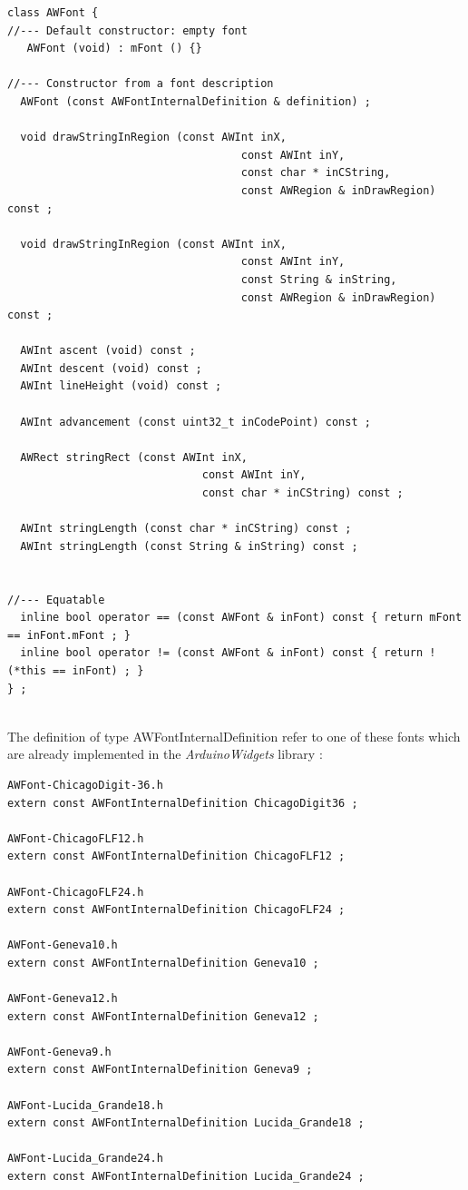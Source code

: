 \documentclass[a4paper,11pt]{extarticle}
\begin{document}
\begin{lstlisting}[language=Arduinonl]
class AWFont {
//--- Default constructor: empty font
   AWFont (void) : mFont () {}

//--- Constructor from a font description
  AWFont (const AWFontInternalDefinition & definition) ;

  void drawStringInRegion (const AWInt inX,
                                    const AWInt inY,
                                    const char * inCString,
                                    const AWRegion & inDrawRegion) const ;

  void drawStringInRegion (const AWInt inX,
                                    const AWInt inY,
                                    const String & inString,
                                    const AWRegion & inDrawRegion) const ;

  AWInt ascent (void) const ;
  AWInt descent (void) const ;
  AWInt lineHeight (void) const ;

  AWInt advancement (const uint32_t inCodePoint) const ;

  AWRect stringRect (const AWInt inX,
                              const AWInt inY,
                              const char * inCString) const ;

  AWInt stringLength (const char * inCString) const ;
  AWInt stringLength (const String & inString) const ;


//--- Equatable
  inline bool operator == (const AWFont & inFont) const { return mFont == inFont.mFont ; }
  inline bool operator != (const AWFont & inFont) const { return !(*this == inFont) ; }
} ;
\end{lstlisting}

~\\ The definition of type AWFontInternalDefinition refer to one of these fonts which are already implemented in the \emph{ArduinoWidgets} library :

\begin{lstlisting}[language=Arduinonl]
AWFont-ChicagoDigit-36.h
extern const AWFontInternalDefinition ChicagoDigit36 ;

AWFont-ChicagoFLF12.h
extern const AWFontInternalDefinition ChicagoFLF12 ;

AWFont-ChicagoFLF24.h
extern const AWFontInternalDefinition ChicagoFLF24 ;

AWFont-Geneva10.h
extern const AWFontInternalDefinition Geneva10 ;

AWFont-Geneva12.h
extern const AWFontInternalDefinition Geneva12 ;

AWFont-Geneva9.h
extern const AWFontInternalDefinition Geneva9 ;

AWFont-Lucida_Grande18.h
extern const AWFontInternalDefinition Lucida_Grande18 ;

AWFont-Lucida_Grande24.h
extern const AWFontInternalDefinition Lucida_Grande24 ;
\end{lstlisting}
\end{document}
